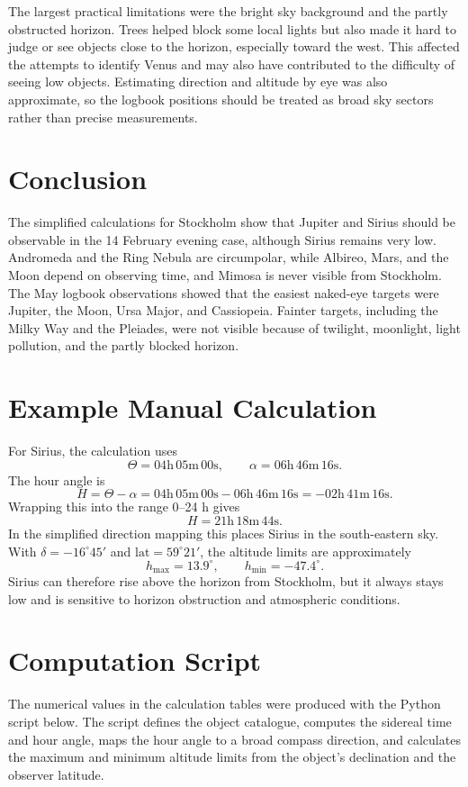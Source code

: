 \documentclass[a4paper,11pt]{article}
\begin{document}
The largest practical limitations were the bright sky background and the partly obstructed horizon. Trees helped block some local lights but also made it hard to judge or see objects close to the horizon, especially toward the west. This affected the attempts to identify Venus and may also have contributed to the difficulty of seeing low objects. Estimating direction and altitude by eye was also approximate, so the logbook positions should be treated as broad sky sectors rather than precise measurements.

\section{Conclusion}
The simplified calculations for Stockholm show that Jupiter and Sirius should be observable in the 14 February evening case, although Sirius remains very low. Andromeda and the Ring Nebula are circumpolar, while Albireo, Mars, and the Moon depend on observing time, and Mimosa is never visible from Stockholm. The May logbook observations showed that the easiest naked-eye targets were Jupiter, the Moon, Ursa Major, and Cassiopeia. Fainter targets, including the Milky Way and the Pleiades, were not visible because of twilight, moonlight, light pollution, and the partly blocked horizon.

\appendix
\section{Example Manual Calculation}
For Sirius, the calculation uses
\[
    \Theta = 04\mathrm{h}\,05\mathrm{m}\,00\mathrm{s},
    \qquad
    \alpha = 06\mathrm{h}\,46\mathrm{m}\,16\mathrm{s}.
\]
The hour angle is
\[
    H = \Theta - \alpha
      = 04\mathrm{h}\,05\mathrm{m}\,00\mathrm{s}
        - 06\mathrm{h}\,46\mathrm{m}\,16\mathrm{s}
      = -02\mathrm{h}\,41\mathrm{m}\,16\mathrm{s}.
\]
Wrapping this into the range 0--24 h gives
\[
    H = 21\mathrm{h}\,18\mathrm{m}\,44\mathrm{s}.
\]
In the simplified direction mapping this places Sirius in the south-eastern sky. With $\delta=-16^\circ45'$ and $\mathrm{lat}=59^\circ21'$, the altitude limits are approximately
\[
    h_{\max}=13.9^\circ,
    \qquad
    h_{\min}=-47.4^\circ.
\]
Sirius can therefore rise above the horizon from Stockholm, but it always stays low and is sensitive to horizon obstruction and atmospheric conditions.

\section{Computation Script}
The numerical values in the calculation tables were produced with the Python script below. The script defines the object catalogue, computes the sidereal time and hour angle, maps the hour angle to a broad compass direction, and calculates the maximum and minimum altitude limits from the object's declination and the observer latitude.


\end{document}
